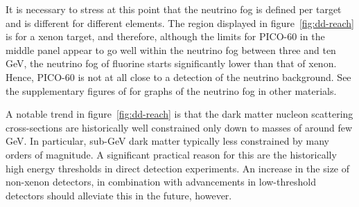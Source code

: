 \documentclass[b5paper, 10pt, twoside]{book}
\begin{document}
It is necessary to stress at this point that the neutrino fog is defined per target and is different for different elements. The region displayed in figure~\ref{fig:dd-reach} is for a xenon target, and therefore, although the limits for PICO-60 in the middle panel appear to go well within the neutrino fog between three and ten GeV, the neutrino fog of fluorine starts significantly lower than that of xenon. Hence, PICO-60 is not at all close to a detection of the neutrino background. See the supplementary figures of \textcite{OHare2021} for graphs of the neutrino fog in other materials.

A notable trend in figure~\ref{fig:dd-reach} is that the dark matter nucleon scattering cross-sections are historically well constrained only down to masses of around few GeV. In particular, sub-GeV dark matter typically less constrained by many orders of magnitude. A significant practical reason for this are the historically high energy thresholds in direct detection experiments. An increase in the size of non-xenon detectors, in combination with advancements in low-threshold detectors should alleviate this in the future, however.
\end{document}
